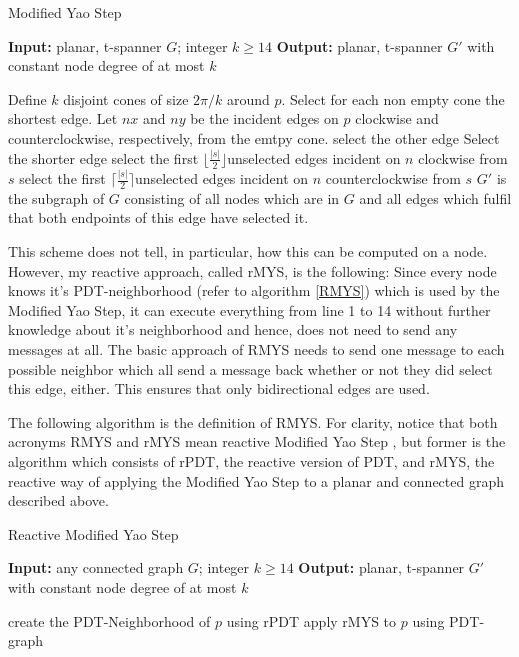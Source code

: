 \algrenewcommand\algorithmicprocedure{\textbf{}}
\begin{algorithm}\small
\caption{Modified Yao Step}\label{MYS}
\begin{algorithmic}[1]
\Statex \textbf{Input:} planar, t-spanner $G $; integer $k\geq 14 $
\Statex \textbf{Output:} planar, t-spanner $G' $ with constant node degree of at most $k $

\Statex

	\State Define $k $ disjoint cones of size $2\pi/k $ around $p $.
	\State Select for each non empty cone the shortest edge.
			\State Let $nx $ and $ny $ be the incident edges on $p $ clockwise and \State counterclockwise, respectively, from the emtpy cone.
				\State select the other edge
				\Else
				\State Select the shorter edge
			\EndIf 
		\Else
			\State select the first $\lfloor \frac{|s|}{2} \rfloor $unselected edges incident on $n $ clockwise from $s $
			\State select the first $\lceil \frac{|s|}{2} \rceil $unselected edges incident on $n $ counterclockwise from $s $
		\EndIf
	\EndFor
\EndFor
\Statex $ G' $ is the subgraph of $G $ consisting of all nodes which are in $G $ and all edges which fulfil that both endpoints of this edge have selected it. 
\end{algorithmic}
\end{algorithm}
 
This scheme does not tell, in particular, how this can be computed on a node.
However, my reactive approach, called rMYS, is the following: Since every node knows it's PDT-neighborhood (refer to algorithm \ref{RMYS}) which is used by the Modified Yao Step, it can execute everything from line 1 to 14 without further knowledge about it's neighborhood and hence, does not need to send any messages at all.
The basic approach of RMYS needs to send one message to each possible neighbor which all send a message back whether or not they did select this edge, either.
This ensures that only bidirectional edges are used.

The following algorithm is the definition of RMYS.
For clarity, notice that both acronyms RMYS and rMYS mean \grqq reactive Modified Yao Step \grqq, but former is the algorithm which consists of rPDT, the reactive version of PDT, and rMYS, the reactive way of applying the Modified Yao Step to a planar and connected graph described above.
 
\begin{algorithm}\small
\caption{Reactive Modified Yao Step}\label{RMYS}
\begin{algorithmic}[0]
\Statex \textbf{Input:} any connected graph $G $; integer $k\geq 14 $
\Statex \textbf{Output:} planar, t-spanner $G' $ with constant node degree of at most $k $

\Statex

	\State create the PDT-Neighborhood of $p $ using rPDT
	\State apply rMYS to $p $ using PDT-graph
\EndFor 
\end{algorithmic}
\end{algorithm}



